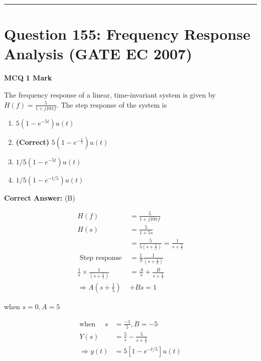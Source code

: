 \documentclass[11pt,a4paper]{article}
\begin{document}
\vspace{1.5em}
\hrule
\vspace{1.5em}

\section*{Question 155: Frequency Response Analysis (GATE EC 2007)}
\noindent \textbf{\color{primary}MCQ} \hfill \textbf{\color{secondary}1 Mark}


\noindent The frequency response of a linear, time-invariant system is given by $H(f)=\frac{5}{1+j10 \pi f}$. The step response of the system is


\begin{enumerate}[label=(\Alph*)]
    \item $5(1-e^{-5t})u(t)$
    \item \textbf{(Correct)} $5(1-e^{-\frac{t}{5}})u(t)$
    \item $1/5(1-e^{-5t})u(t)$
    \item $1/5(1-e^{-t/5})u(t)$
\end{enumerate}

\noindent \textbf{Correct Answer:} (B)

\begin{tcolorbox}[solbox, title=Detailed Solution -- Question 155]
\[
\begin{aligned} H(f) &=\frac{5}{1+j 10 \pi f} \\ H(s) &=\frac{5}{1+5 s} \\ &=\frac{5}{5\left(s+\frac{1}{5}\right)}=\frac{1}{s+\frac{1}{5}} \\ \text { Step response } &=\frac{1}{S} \frac{1}{\left(s+\frac{1}{5}\right)} \\ \frac{1}{s} \times \frac{1}{\left(s+\frac{1}{5}\right)} &=\frac{A}{s}+\frac{B}{s+\frac{1}{5}} \\ \Rightarrow A\left(s+\frac{1}{5}\right)&+B s=1 \end{aligned}
\]

 when $s=0, A=5$

\[
\begin{aligned} \text{when }\quad s&=\frac{-1}{5}, B=-5 \\ Y(s) &=\frac{5}{s}-\frac{5}{s+\frac{1}{5}} \\ \Rightarrow y(t)&=5\left[1-e^{-t / 5}\right] u(t) \end{aligned}
\]
\end{tcolorbox}
\end{document}
